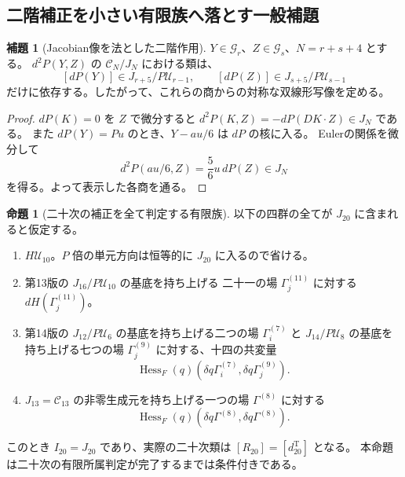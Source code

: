 \documentclass[a4paper,11pt]{ltjsarticle}
\theoremstyle{definition}
\newtheorem{lemma}[theorem]{補題}
\newtheorem{proposition}[theorem]{命題}
\begin{document}
\subsection{二階補正を小さい有限族へ落とす一般補題}

\begin{lemma}[Jacobian像を法とした二階作用]
\label{lem:v15-hessian-pairing-quotient}
$Y\in\mathcal G_r$、$Z\in\mathcal G_s$、$N=r+s+4$ とする。
$d^2P(Y,Z)$ の $\mathcal C_N/J_N$ における類は、
\[
 [dP(Y)]\in J_{r+5}/P\mathcal U_{r-1},\qquad
 [dP(Z)]\in J_{s+5}/P\mathcal U_{s-1}
\]
だけに依存する。したがって、これらの商からの対称な双線形写像を定める。
\end{lemma}

\begin{proof}
$dP(K)=0$ を $Z$ で微分すると
$d^2P(K,Z)=-dP(DK\cdot Z)\in J_N$ である。
また $dP(Y)=Pu$ のとき、$Y-au/6$ は $dP$ の核に入る。
Eulerの関係を微分して
\[
 d^2P(a u/6,Z)=\frac56u\,dP(Z)\in J_N
\]
を得る。よって表示した各商を通る。
\end{proof}

\begin{proposition}[二十次の補正を全て判定する有限族]
\label{prop:v15-finite-lower-tests}
以下の四群の全てが $J_{20}$ に含まれると仮定する。
\begin{enumerate}
 \item $H\mathcal U_{10}$。$P$ 倍の単元方向は恒等的に $J_{20}$ に入るので省ける。
 \item 第13版の $J_{16}/P\mathcal U_{10}$ の基底を持ち上げる
 二十一の場 $\Gamma_j^{(11)}$ に対する $dH(\Gamma_j^{(11)})$。
 \item 第14版の $J_{12}/P\mathcal U_6$ の基底を持ち上げる二つの場
 $\Gamma_i^{(7)}$ と $J_{14}/P\mathcal U_8$ の基底を持ち上げる七つの場
 $\Gamma_j^{(9)}$ に対する、十四の共変量
 \[
 \operatorname{Hess}_F(q)
    (\delta q\Gamma_i^{(7)},\delta q\Gamma_j^{(9)}).
 \]
 \item $J_{13}=\mathcal C_{13}$ の非零生成元を持ち上げる一つの場
 $\Gamma^{(8)}$ に対する
 \[
 \operatorname{Hess}_F(q)(\delta q\Gamma^{(8)},\delta q\Gamma^{(8)}).
 \]
\end{enumerate}
このとき $I_{20}=J_{20}$ であり、実際の二十次類は
$[R_{20}]=[d_{20}^{\mathrm T}]$ となる。
本命題は二十次の有限所属判定が完了するまでは条件付きである。
\end{proposition}
\end{document}
